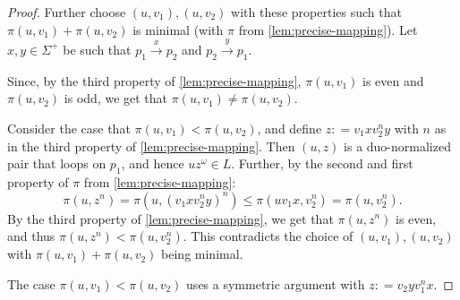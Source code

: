 \documentclass[a4paper,USenglish,cleveref,autoref,thm-restate]{lipics-v2021}
\begin{document}
{\begin{proof}
  Further choose $(u,v_1),(u,v_2)$ with these properties such that $\pi(u,v_1) + \pi(u,v_2)$ is minimal (with $\pi$ from \cref{lem:precise-mapping}). Let $x,y \in \Sigma^+$ be such that $p_1 \xrightarrow{x} p_2$ and $p_2 \xrightarrow{y} p_1$.

  Since, by the third property of \cref{lem:precise-mapping}, $\pi(u,v_1)$ is even and $\pi(u,v_2)$ is odd, we get that $\pi(u,v_1) \not= \pi(u,v_2)$.

  Consider the case that $\pi(u,v_1) < \pi(u,v_2)$, and define $z: = v_1xv_2^ny$ with $n$ as in the third property of \cref{lem:precise-mapping}. Then $(u,z)$ is a duo-normalized pair that loops on $p_1$, and hence $uz^\omega \in L$. Further, by the second and first property of $\pi$ from \cref{lem:precise-mapping}:
  \[
\pi(u,z^n) = \pi(u,(v_1xv_2^ny)^n) \le \pi(uv_1x,v_2^n) = \pi(u,v_2^n).
\]
By the third property of \cref{lem:precise-mapping}, we get that $\pi(u,z^n)$ is even, and thus  $\pi(u,z^n) < \pi(u,v_2^n)$. This contradicts the choice of $(u,v_1),(u,v_2)$ with $\pi(u,v_1) + \pi(u,v_2)$ being minimal.


The case $\pi(u,v_1) < \pi(u,v_2)$ uses a symmetric argument with $z: = v_2yv_1^nx$.
\end{proof}

 }
\end{document}
